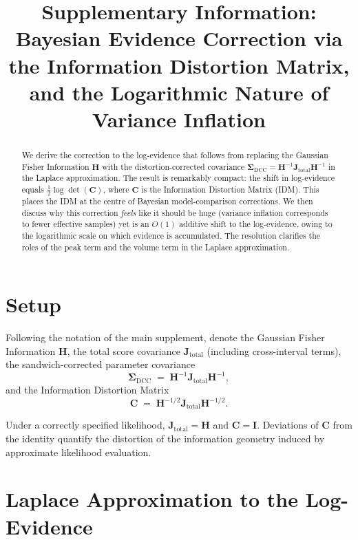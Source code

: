 \documentclass[11pt]{article}
\title{Supplementary Information:\\
Bayesian Evidence Correction via the Information Distortion Matrix,\\
and the Logarithmic Nature of Variance Inflation}
\author{}
\date{}
\begin{document}
\maketitle

\begin{abstract}
\noindent We derive the correction to the log-evidence that follows from replacing the Gaussian Fisher Information $\mathbf H$ with the distortion-corrected covariance $\boldsymbol\Sigma_{\mathrm{DCC}} = \mathbf H^{-1}\mathbf J_{\mathrm{total}}\mathbf H^{-1}$ in the Laplace approximation. The result is remarkably compact: the shift in log-evidence equals $\tfrac{1}{2}\log\det(\mathbf C)$, where $\mathbf C$ is the Information Distortion Matrix (IDM). This places the IDM at the centre of Bayesian model-comparison corrections. We then discuss why this correction \emph{feels} like it should be huge (variance inflation corresponds to fewer effective samples) yet is an $O(1)$ additive shift to the log-evidence, owing to the logarithmic scale on which evidence is accumulated. The resolution clarifies the roles of the peak term and the volume term in the Laplace approximation.
\end{abstract}

\section{Setup}

Following the notation of the main supplement, denote the Gaussian Fisher Information $\mathbf H$, the total score covariance $\mathbf J_{\mathrm{total}}$ (including cross-interval terms), the sandwich-corrected parameter covariance
\begin{equation}
\boldsymbol\Sigma_{\mathrm{DCC}}
\;=\;
\mathbf H^{-1}
\mathbf J_{\mathrm{total}}
\mathbf H^{-1},
\end{equation}
and the Information Distortion Matrix
\begin{equation}
\mathbf C
\;=\;
\mathbf H^{-1/2}
\mathbf J_{\mathrm{total}}
\mathbf H^{-1/2}.
\end{equation}

Under a correctly specified likelihood, $\mathbf J_{\mathrm{total}} = \mathbf H$ and $\mathbf C = \mathbf I$. Deviations of $\mathbf C$ from the identity quantify the distortion of the information geometry induced by approximate likelihood evaluation.

\section{Laplace Approximation to the Log-Evidence}
\end{document}
